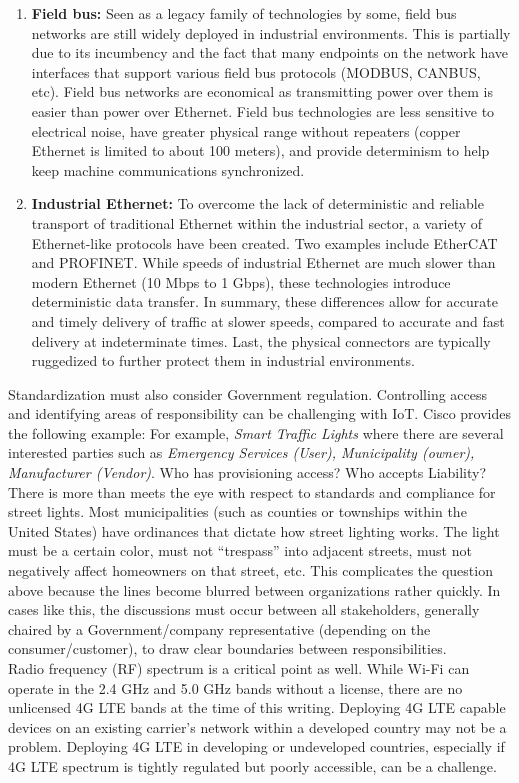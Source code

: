 \begin{enumerate}
  \item	\textbf{Field bus:} Seen as a legacy family of technologies by some,
  field bus networks are still widely deployed in industrial environments.
  This is partially due to its incumbency and the fact that many endpoints on
  the network have interfaces that support various field bus protocols
  (MODBUS, CANBUS, etc). Field bus networks are economical as transmitting
  power over them is easier than power over Ethernet. Field bus technologies
  are less sensitive to electrical noise, have greater physical range without
  repeaters (copper Ethernet is limited to about 100 meters), and provide
  determinism to help keep machine communications synchronized.
  \item	\textbf{Industrial Ethernet:} To overcome the lack of deterministic
  and reliable transport of traditional Ethernet within the industrial sector,
  a variety of Ethernet-like protocols have been created. Two examples include
  EtherCAT and PROFINET\@. While speeds of industrial Ethernet are much slower
  than modern Ethernet (10 Mbps to 1 Gbps), these technologies introduce
  deterministic data transfer. In summary, these differences allow for
  accurate and timely delivery of traffic at slower speeds, compared to
  accurate and fast delivery at indeterminate times. Last, the physical
  connectors are typically ruggedized to further protect them in industrial
  environments.
\end{enumerate}

Standardization must also consider Government regulation. Controlling access
and identifying areas of responsibility can be challenging with IoT. Cisco
provides the following example:  For example, \textit{Smart Traffic Lights}
where there are several interested parties such as \textit{Emergency Services
(User), Municipality (owner), Manufacturer (Vendor)}. Who has provisioning
access? Who accepts Liability? \\

There is more than meets the eye with respect to standards and compliance for
street lights. Most municipalities (such as counties or townships within the
United States) have ordinances that dictate how street lighting works. The
light must be a certain color, must not ``trespass'' into adjacent streets,
must not negatively affect homeowners on that street, etc. This complicates
the question above because the lines become blurred between organizations
rather quickly. In cases like this, the discussions must occur between all
stakeholders, generally chaired by a Government/company representative
(depending on the consumer/customer), to draw clear boundaries between
responsibilities. \\

Radio frequency (RF) spectrum is a critical point as well. While Wi-Fi can
operate in the 2.4 GHz and 5.0 GHz bands without a license, there are no
unlicensed 4G LTE bands at the time of this writing. Deploying 4G LTE capable
devices on an existing carrier’s network within a developed country may not be
a problem. Deploying 4G LTE in developing or undeveloped countries, especially
if 4G LTE spectrum is tightly regulated but poorly accessible, can be a challenge.
